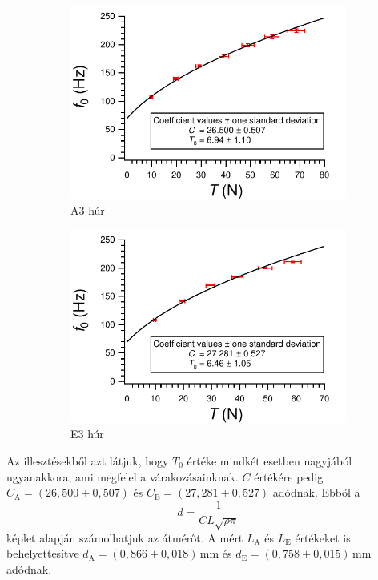 \documentclass[a4paper,12pt]{article}
\begin{document}
\begin{figure}[h!]
\centering
\begin{subfigure}[t]{0.5\linewidth}
\centering
\includegraphics[width = \linewidth]{f_vs_T_A.pdf}
\caption{A3 húr}
\end{subfigure}%
\begin{subfigure}[t]{0.5\linewidth}
\centering
\includegraphics[width = \linewidth]{f_vs_T_E.pdf}
\caption{E3 húr}
\end{subfigure}
\caption{}
\label{f_vs_T}
\end{figure}

Az illesztésekből azt látjuk, hogy $T_0$ értéke mindkét esetben nagyjából ugyanakkora, ami megfelel a várakozásainknak. $C$ értékére pedig $C_\text{A} = (26,500 \pm 0,507)$ és $C_\text{E} = (27,281 \pm 0,527)$ adódnak. Ebből a
$$ d = \frac{1}{C L \sqrt{\rho \pi}} $$
képlet alapján számolhatjuk az átmérőt. A mért $L_\text{A}$ és $L_\text{E}$ értékeket is behelyettesítve $d_\text{A} = (0,866 \pm 0,018)$\,mm és $d_\text{E} = (0,758 \pm 0,015)$\,mm adódnak.
\end{document}
